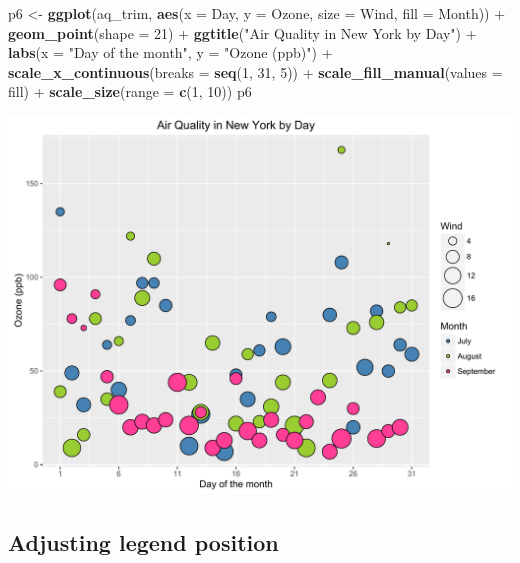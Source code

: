 \documentclass[]{article}
\newenvironment{Shaded}{\begin{snugshade}}{\end{snugshade}}
\newcommand{\KeywordTok}[1]{\textcolor[rgb]{0.13,0.29,0.53}{\textbf{{#1}}}}
\newcommand{\DataTypeTok}[1]{\textcolor[rgb]{0.13,0.29,0.53}{{#1}}}
\newcommand{\DecValTok}[1]{\textcolor[rgb]{0.00,0.00,0.81}{{#1}}}
\newcommand{\StringTok}[1]{\textcolor[rgb]{0.31,0.60,0.02}{{#1}}}
\newcommand{\NormalTok}[1]{{#1}}
\begin{document}
\begin{Shaded}
\begin{Highlighting}[]
\NormalTok{p6 <-}\StringTok{ }\KeywordTok{ggplot}\NormalTok{(aq_trim, }\KeywordTok{aes}\NormalTok{(}\DataTypeTok{x =} \NormalTok{Day, }\DataTypeTok{y =} \NormalTok{Ozone, }\DataTypeTok{size =} \NormalTok{Wind, }\DataTypeTok{fill =} \NormalTok{Month)) +}\StringTok{ }
\StringTok{      }\KeywordTok{geom_point}\NormalTok{(}\DataTypeTok{shape =} \DecValTok{21}\NormalTok{) +}
\StringTok{      }\KeywordTok{ggtitle}\NormalTok{(}\StringTok{"Air Quality in New York by Day"}\NormalTok{) +}\StringTok{ }
\StringTok{      }\KeywordTok{labs}\NormalTok{(}\DataTypeTok{x =} \StringTok{"Day of the month"}\NormalTok{, }\DataTypeTok{y =} \StringTok{"Ozone (ppb)"}\NormalTok{) +}
\StringTok{      }\KeywordTok{scale_x_continuous}\NormalTok{(}\DataTypeTok{breaks =} \KeywordTok{seq}\NormalTok{(}\DecValTok{1}\NormalTok{, }\DecValTok{31}\NormalTok{, }\DecValTok{5}\NormalTok{)) +}
\StringTok{      }\KeywordTok{scale_fill_manual}\NormalTok{(}\DataTypeTok{values =} \NormalTok{fill) +}
\StringTok{      }\KeywordTok{scale_size}\NormalTok{(}\DataTypeTok{range =} \KeywordTok{c}\NormalTok{(}\DecValTok{1}\NormalTok{, }\DecValTok{10}\NormalTok{))}
\NormalTok{p6}
\end{Highlighting}
\end{Shaded}

\begin{center}\includegraphics{0_all_posts_pdf/wscatter_13-1} \end{center}

\subsection{Adjusting legend
position}\label{adjusting-legend-position-4}
\end{document}
